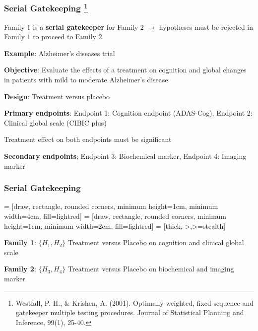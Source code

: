 \documentclass[xcolor={dvipsnames}]{beamer}
\newcommand{\rbf}[1]{\textcolor{redUnipd}{ #1}}
\begin{document}
\begin{frame}
\frametitle{Serial Gatekeeping \footnote{Westfall, P. H., & Krishen, A. (2001). Optimally weighted, fixed sequence and gatekeeper multiple testing procedures. Journal of Statistical Planning and Inference, 99(1), 25-40.}}

Family $1$ is a \textbf{\rbf{serial gatekeeper}} for Family $2$ $\rightarrow$  hypotheses must be rejected in Family $1$ to proceed to Family $2$.

\bigskip
\rbf{\textbf{Example}}: Alzheimer's diseases trial

\textbf{Objective}: Evaluate the effects of a treatment on cognition
and global changes in patients with mild to moderate Alzheimer's disease

\textbf{Design}: Treatment versus placebo

\textbf{Primary endpoints}: Endpoint 1: Cognition endpoint (ADAS-Cog), Endpoint 2: Clinical global scale (CIBIC plus)

Treatment effect on both endpoints must be significant

\textbf{Secondary endpoints}; Endpoint 3: Biochemical marker, Endpoint 4: Imaging marker
\end{frame}

\begin{frame}
\frametitle{Serial Gatekeeping}
 = [draw, rectangle, rounded corners, minimum height=1cm, minimum width=4cm, fill=lightred]
 = [draw, rectangle, rounded corners, minimum height=1cm, minimum width=2cm, fill=lightred]
 = [thick,->,>=stealth]

\begin{figure}
\centering

\end{figure}
\textbf{Family 1}: $\{H_1, H_2\}$  Treatment versus Placebo on cognition and clinical global scale

\textbf{Family 2}: $\{H_3, H_4\}$  Treatment versus Placebo on biochemical and imaging marker
\end{frame}
\end{document}
